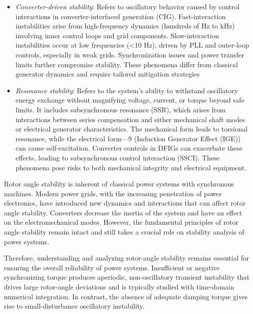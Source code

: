   
\begin{itemize}
    \item \textit{Converter-driven stability}: Refers to oscillatory behavior caused by control interactions in converter-interfaced generation (CIG). 
    Fast-interaction instabilities arise from high-frequency dynamics (hundreds of Hz to kHz) involving inner control loops and grid components. 
    Slow-interaction instabilities occur at low frequencies (<10 Hz), driven by PLL and outer-loop controls, especially 
    in weak grids. Synchronization issues and power transfer limits further compromise stability. 
    These phenomena differ from classical generator dynamics and require tailored mitigation strategies
    \item \textit{Resonance stability}: Refers to the system's ability to withstand oscillatory 
    energy exchange without magnifying voltage, current, or torque beyond safe limits. It includes subsynchronous 
    resonance (SSR), which arises from interactions between series compensation and either mechanical shaft modes or 
    electrical generator characteristics. The mechanical form leads to torsional resonance, while the electrical 
    form—9 (Induction Generator Effect (IGE)) can cause self-excitation. Converter controls in DFIGs can exacerbate these 
    effects, leading to subsynchronous control interaction (SSCI). These phenomena pose risks to both mechanical integrity 
    and electrical equipment.
\end{itemize}


Rotor angle stability is inherent of classical power systems with synchronous machines. Modern power grids, with the increasing penetration of 
power electronics, have introduced new dynamics and interactions that can affect rotor angle stability. Converters decrease the inertia of the system
and have an effect on the electromechanical modes. However, the fundamental principles of rotor angle stability remain intact and still takes
a crucial role on stability analysis of power systems.

Therefore, understanding and analyzing rotor-angle stability remains essential for ensuring the overall reliability of power systems. 
Insufficient or negative synchronizing torque produces aperiodic, non-oscillatory transient instability that drives large rotor-angle deviations
and is typically studied with time-domain numerical integration. In contrast, the absence of adequate damping torque gives rise to small-disturbance
oscillatory instability.

